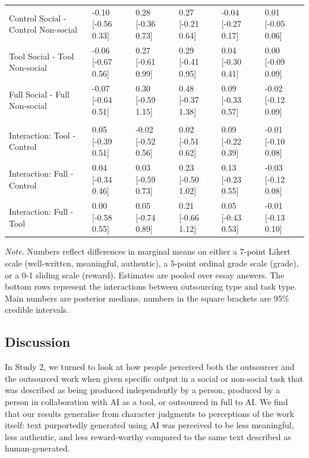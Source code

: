 \documentclass[
  man,
  floatsintext,
  longtable,
  nolmodern,
  notxfonts,
  notimes,
  colorlinks=true,linkcolor=blue,citecolor=blue,urlcolor=blue]{apa7}
\begin{document}
\begin{table}
\begin{tabular}{llllll}
\hspace{1em}Control Social - Control Non-social & -0.10 [-0.56 0.33] & 0.28 [-0.36 0.73] & 0.27 [-0.21 0.64] & -0.04 [-0.27 0.17] & 0.01 [-0.05 0.06]\\
\hspace{1em}Tool Social - Tool Non-social & -0.06 [-0.67 0.56] & 0.27 [-0.61 0.99] & 0.29 [-0.41 0.95] & 0.04 [-0.30 0.41] & 0.00 [-0.09 0.09]\\
\hspace{1em}Full Social - Full Non-social & -0.07 [-0.64 0.51] & 0.30 [-0.59 1.15] & 0.48 [-0.37 1.38] & 0.09 [-0.33 0.57] & -0.02 [-0.12 0.09]\\
\addlinespace[0.3em]
\multicolumn{6}{l}{\textbf{Interaction effect}}\\
\hspace{1em}Interaction: Tool - Control & 0.05 [-0.39 0.51] & -0.02 [-0.52 0.56] & 0.02 [-0.51 0.62] & 0.09 [-0.22 0.39] & -0.01 [-0.10 0.08]\\
\hspace{1em}Interaction: Full - Control & 0.04 [-0.34 0.46] & 0.03 [-0.59 0.73] & 0.23 [-0.50 1.02] & 0.13 [-0.23 0.55] & -0.03 [-0.12 0.08]\\
\hspace{1em}Interaction: Full - Tool & 0.00 [-0.58 0.55] & 0.05 [-0.74 0.89] & 0.21 [-0.66 1.12] & 0.05 [-0.43 0.53] & -0.01 [-0.13 0.10]\\
\bottomrule
\end{tabular}
\endgroup{}\vspace{20pt}

\vspace{-20pt}
\noindent \emph{Note.} Numbers reflect differences in marginal means on
either a 7-point Likert scale (well-written, meaningful, authentic), a
5-point ordinal grade scale (grade), or a 0-1 sliding scale (reward).
Estimates are pooled over essay answers. The bottom rows represent the
interactions between outsourcing type and task type. Main numbers are
posterior medians, numbers in the square brackets are 95\% credible
intervals.

\end{table}

\subsection*{Discussion}\label{discussion-1}

In Study 2, we turned to look at how people perceived both the
outsourcer and the outsourced work when given specific output in a
social or non-social task that was described as being produced
independently by a person, produced by a person in collaboration with AI
as a tool, or outsourced in full to AI. We find that our results
generalise from character judgments to perceptions of the work itself:
text purportedly generated using AI was perceived to be less meaningful,
less authentic, and less reward-worthy compared to the same text
described as human-generated.
\end{document}
